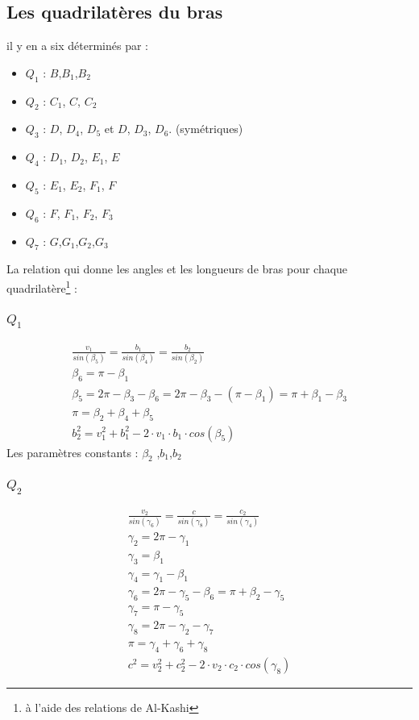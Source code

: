 \documentclass[12pt,a4paper]{article}
\begin{document}
\subsection{Les quadrilatères du bras}
il y en a six déterminés par : 

\begin{itemize}
	\item $Q_1$ : $B$,$B_1$,$B_2$
	\item $Q_2$ : $C_1$, $C$, $C_2$
	\item $Q_3$ : $D$, $D_4$, $D_5$ et $D$, $D_3$, $D_6$. (symétriques)
	\item $Q_4$ : $D_1$, $D_2$, $E_1$, $E$
	\item $Q_5$ : $E_1$, $E_2$, $F_1$, $F$
	\item $Q_6$ : $F$, $F_1$, $F_2$, $F_3$
	\item $Q_7$ : $G$,$G_1$,$G_2$,$G_3$
\end{itemize}

La relation qui donne les angles et les longueurs de bras pour chaque quadrilatère\footnote{à l'aide des relations de Al-Kashi} : 

\subsubsection{$Q_1$}
\begin{eqnarray}
\frac{v_1}{sin(\beta_5)}=\frac{b_1}{sin(\beta_4)}=\frac{b_2}{sin(\beta_2)}\\
\beta_6=\pi-\beta_1\\
\beta_5=2\pi-\beta_3-\beta_6=2\pi-\beta_3-(\pi-\beta_1)=\pi+\beta_1-\beta_3\\
\pi=\beta_2+\beta_4+\beta_5\\
b_2^2=v_1^2+b_1^2- 2 \cdot v_1 \cdot b_1 \cdot cos(\beta_5)
\end{eqnarray}
Les paramètres constants : $\beta_2$ ,$b_1$,$b_2$
\subsubsection{$Q_2$}
\begin{eqnarray}
\frac{v_2}{sin(\gamma_6)}=\frac{c}{sin(\gamma_8)}=\frac{c_2}{sin(\gamma_4)}\\
\gamma_2=2\pi-\gamma_1\\
\gamma_3=\beta_1\\
\gamma_4=\gamma_1-\beta_1\\
\gamma_6=2\pi-\gamma_5-\beta_6=\pi+\beta_2-\gamma_5\\
\gamma_7=\pi-\gamma_5\\
\gamma_8=2\pi-\gamma_2-\gamma_7\\
\pi=\gamma_4+\gamma_6+\gamma_8\\
c^2=v_2^2+c_2^2- 2 \cdot v_2 \cdot c_2 \cdot cos(\gamma_8)
\end{eqnarray}
\end{document}
